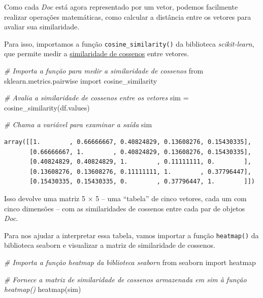 \documentclass[
  brazilian,
]{article}
\newenvironment{Shaded}{}{}
\newcommand{\CommentTok}[1]{\textcolor[rgb]{0.38,0.63,0.69}{\textit{#1}}}
\newcommand{\ImportTok}[1]{#1}
\newcommand{\NormalTok}[1]{#1}
\newcommand{\OperatorTok}[1]{\textcolor[rgb]{0.40,0.40,0.40}{#1}}
\begin{document}
Como cada \emph{Doc} está agora representado por um vetor, podemos
facilmente realizar operações matemáticas, como calcular a distância
entre os vetores para avaliar sua similaridade.

Para isso, importamos a função \texttt{cosine\_similarity()} da
biblioteca \emph{scikit-learn}, que permite medir a
\href{https://pt.wikipedia.org/wiki/Similaridade_por_cosseno}{similaridade
de cossenos} entre vetores.

\begin{Shaded}
\begin{Highlighting}[]
\CommentTok{\# Importa a função para medir a similaridade de cossenos}
\ImportTok{from}\NormalTok{ sklearn.metrics.pairwise }\ImportTok{import}\NormalTok{ cosine\_similarity}

\CommentTok{\# Avalia a similaridade de cossenos entre os vetores}
\NormalTok{sim }\OperatorTok{=}\NormalTok{ cosine\_similarity(df.values)}

\CommentTok{\# Chama a variável para examinar a saída}
\NormalTok{sim}
\end{Highlighting}
\end{Shaded}

\begin{verbatim}
array([[1.        , 0.66666667, 0.40824829, 0.13608276, 0.15430335],
       [0.66666667, 1.        , 0.40824829, 0.13608276, 0.15430335],
       [0.40824829, 0.40824829, 1.        , 0.11111111, 0.        ],
       [0.13608276, 0.13608276, 0.11111111, 1.        , 0.37796447],
       [0.15430335, 0.15430335, 0.        , 0.37796447, 1.        ]])
\end{verbatim}

Isso devolve uma matriz 5 × 5 -- uma ``tabela'' de cinco vetores, cada
um com cinco dimensões -- com as similaridades de cossenos entre cada
par de objetos \emph{Doc}.

Para nos ajudar a interpretar essa tabela, vamos importar a função
\texttt{heatmap()} da biblioteca seaborn e visualizar a matriz de
similaridade de cossenos.

\begin{Shaded}
\begin{Highlighting}[]
\CommentTok{\# Importa a função heatmap da biblioteca seaborn}
\ImportTok{from}\NormalTok{ seaborn }\ImportTok{import}\NormalTok{ heatmap}

\CommentTok{\# Fornece a matriz de similaridade de cossenos armazenada em \textquotesingle{}sim\textquotesingle{} à função heatmap()}
\NormalTok{heatmap(sim)}
\end{Highlighting}
\end{Shaded}
\end{document}
